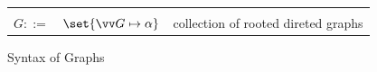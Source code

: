 \begin{figure}[h]
   {\small
   \begin{minipage}[t]{0.48\textwidth}
      \begin{tabularx}{\textwidth}{rL{2.8cm}L{3cm}}
         &&
         \\
         $G ::=$
         &
         $\set{\seq{G \mapsto \alpha}}$
         &
         collection of rooted direted graphs
         \\
      \end{tabularx}
   \end{minipage}
   }
   \caption{Syntax of Graphs}
   \label{fig:graph-syntax}
\end{figure}
